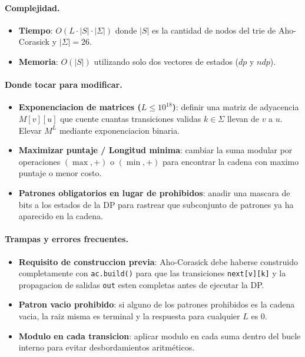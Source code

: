 \paragraph{Complejidad.}
\begin{itemize}\setlength\itemsep{0pt}
	\item \textbf{Tiempo}: $O(L \cdot |S| \cdot |\Sigma|)$ donde $|S|$ es la cantidad de nodos del trie de Aho-Corasick y $|\Sigma| = 26$.
	\item \textbf{Memoria}: $O(|S|)$ utilizando solo dos vectores de estados ($dp$ y $ndp$).
\end{itemize}

\paragraph{Donde tocar para modificar.}
\begin{itemize}\setlength\itemsep{0pt}
	\item \textbf{Exponenciacion de matrices ($L \le 10^{18}$)}: definir una matriz de adyacencia $M[v][u]$ que cuente cuantas transiciones validas $k \in \Sigma$ llevan de $v$ a $u$. Elevar $M^L$ mediante exponenciacion binaria.
	\item \textbf{Maximizar puntaje / Longitud minima}: cambiar la suma modular por operaciones $(\max, +)$ o $(\min, +)$ para encontrar la cadena con maximo puntaje o menor costo.
	\item \textbf{Patrones obligatorios en lugar de prohibidos}: anadir una mascara de bits a los estados de la DP para rastrear que subconjunto de patrones ya ha aparecido en la cadena.
\end{itemize}

\paragraph{Trampas y errores frecuentes.}
\begin{itemize}\setlength\itemsep{0pt}
	\item \textbf{Requisito de construccion previa}: Aho-Corasick debe haberse construido completamente con \verb|ac.build()| para que las transiciones \verb|next[v][k]| y la propagacion de salidas \verb|out| esten completas antes de ejecutar la DP.
	\item \textbf{Patron vacio prohibido}: si alguno de los patrones prohibidos es la cadena vacia, la raiz misma es terminal y la respuesta para cualquier $L$ es 0.
	\item \textbf{Modulo en cada transicion}: aplicar modulo en cada suma dentro del bucle interno para evitar desbordamientos aritméticos.
\end{itemize}

